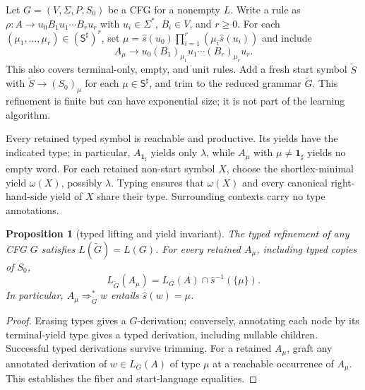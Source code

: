 \documentclass[11pt,a4paper]{article}
\newtheorem{proposition}[theorem]{Proposition}
\theoremstyle{remark}
\theoremstyle{plain}
\begin{document}
Let $G=(V,\Sigma,P,S_0)$ be a CFG for
a nonempty $L$.  Write a rule as
$\rho:A\to u_0B_1u_1\cdots B_ru_r$
with $u_i\in\Sigma^*$, $B_i\in V$, and $r\ge0$.
For each $(\mu_1,\ldots,\mu_r)\in(\mathsf S^\sharp)^r$,
set $\mu=\widehat s(u_0)\prod_{i=1}^r
(\mu_i\widehat s(u_i))$ and include
\[
 A_\mu\to u_0(B_1)_{\mu_1}u_1\cdots(B_r)_{\mu_r}u_r.
\]
This also covers terminal-only, empty, and unit rules.
Add a fresh start symbol $\widetilde S$ with
$\widetilde S\to(S_0)_\mu$ for each
$\mu\in\mathsf S^\sharp$, and trim to the reduced
grammar $\widetilde G$.  This refinement is finite
but can have exponential size; it is not part of
the learning algorithm.

Every retained typed symbol is reachable and productive.
Its yields have the indicated type; in particular,
$A_{\mathbf{1}_{\sharp}}$ yields only $\lambda$, while
$A_\mu$ with $\mu\ne\mathbf{1}_{\sharp}$ yields no empty word.
For each retained non-start symbol $X$, choose the
shortlex-minimal yield $\omega(X)$, possibly $\lambda$.
Typing ensures that $\omega(X)$ and every canonical
right-hand-side yield of $X$ share their type.
Surrounding contexts carry no type annotations.

\begin{proposition}[typed lifting and yield invariant]\label{prop:typed-core}
The typed refinement of any CFG $G$ satisfies
$L(\widetilde G)=L(G)$.  For every retained $A_\mu$,
including typed copies of $S_0$,
\[
L_{\widetilde G}(A_\mu)
 =L_G(A)\cap \widehat s^{-1}(\{\mu\}).
\]
In particular, $A_\mu\Rightarrow_{\widetilde G}^*w$
entails $\widehat s(w)=\mu$.
\end{proposition}
\begin{proof}
Erasing types gives a $G$-derivation; conversely,
annotating each node by its terminal-yield type
gives a typed derivation, including nullable children.
Successful typed derivations survive trimming.
For a retained $A_\mu$, graft any annotated
derivation of $w\in L_G(A)$ of type $\mu$
at a reachable occurrence of $A_\mu$.
This establishes the fiber and start-language equalities.
\end{proof}
\end{document}
